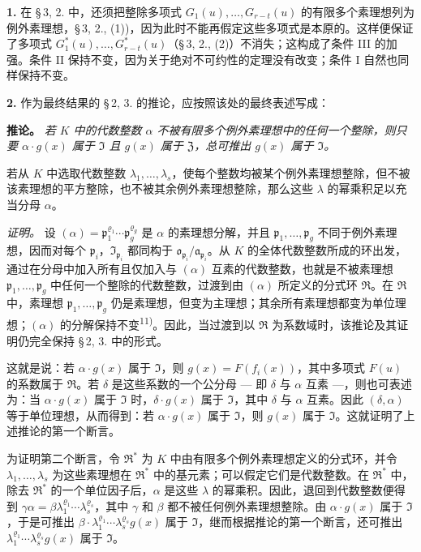 \documentclass[11pt]{article}
\begin{document}
\medskip\noindent\textbf{1.}
在 \S\,3, 2. 中，还须把整除多项式 $G_1(u),\ldots,G_{r-t}(u)$ 的有限多个素理想列为例外素理想，\S\,3, 2., (1))，因为此时不能再假定这些多项式是本原的。这样便保证了多项式 $G^*_1(u),\ldots,G^*_{r-t}(u)$（\S\,3, 2., (2)）不消失；这构成了条件 III 的加强。条件 II 保持不变，因为关于绝对不可约性的定理没有改变；条件 I 自然也同样保持不变。

\medskip\noindent\textbf{2.}
作为最终结果的 \S\,2, 3. 的推论，应按照该处的最终表述写成：

\noindent\textbf{推论。}
\textit{若 $K$ 中的代数整数 $\alpha$ 不被有限多个例外素理想中的任何一个整除，则只要 $\alpha \cdot g(x)$ 属于 $\mathfrak{I}$ 且 $g(x)$ 属于 $\mathfrak{Z}$，总可推出 $g(x)$ 属于 $\mathfrak{I}$。}

若从 $K$ 中选取代数整数 $\lambda_1,\ldots,\lambda_s$，使每个整数均被某个例外素理想整除，但不被该素理想的平方整除，也不被其余例外素理想整除，那么这些 $\lambda$ 的幂乘积足以充当分母 $\alpha$。

\noindent\textit{证明。}
设 $(\alpha) = \mathfrak{p}_1^{\varrho_1} \cdots \mathfrak{p}_g^{\varrho_g}$ 是 $\alpha$ 的素理想分解，并且 $\mathfrak{p}_1,\ldots,\mathfrak{p}_g$ 不同于例外素理想，因而对每个 $\mathfrak{p}_i$，$\mathfrak{I}_{\mathfrak{p}_i}$ 都同构于 $\mathfrak{o}_{\mathfrak{p}_i}/\mathfrak{a}_{\mathfrak{p}_i}$。从 $K$ 的全体代数整数所成的环出发，通过在分母中加入所有且仅加入与 $(\alpha)$ 互素的代数整数，也就是不被素理想 $\mathfrak{p}_1,\ldots,\mathfrak{p}_g$ 中任何一个整除的代数整数，过渡到由 $(\alpha)$ 所定义的分式环 $\mathfrak{R}$。在 $\mathfrak{R}$ 中，素理想 $\mathfrak{p}_1,\ldots,\mathfrak{p}_g$ 仍是素理想，但变为主理想；其余所有素理想都变为单位理想；$(\alpha)$ 的分解保持不变\textsuperscript{11)}。因此，当过渡到以 $\mathfrak{R}$ 为系数域时，该推论及其证明仍完全保持 \S\,2, 3. 中的形式。

这就是说：若 $\alpha \cdot g(x)$ 属于 $\mathfrak{I}$，则 $g(x) = F(f_i(x))$，其中多项式 $F(u)$ 的系数属于 $\mathfrak{R}$。若 $\delta$ 是这些系数的一个公分母 --- 即 $\delta$ 与 $\alpha$ 互素 ---，则也可表述为：当 $\alpha \cdot g(x)$ 属于 $\mathfrak{I}$ 时，$\delta \cdot g(x)$ 属于 $\mathfrak{I}$，其中 $\delta$ 与 $\alpha$ 互素。因此 $(\delta, \alpha)$ 等于单位理想，从而得到：若 $\alpha \cdot g(x)$ 属于 $\mathfrak{I}$，则 $g(x)$ 属于 $\mathfrak{I}$。这就证明了上述推论的第一个断言。

为证明第二个断言，令 $\mathfrak{R}^*$ 为 $K$ 中由有限多个例外素理想定义的分式环，并令 $\lambda_1,\ldots,\lambda_s$ 为这些素理想在 $\mathfrak{R}^*$ 中的基元素；可以假定它们是代数整数。在 $\mathfrak{R}^*$ 中，除去 $\mathfrak{R}^*$ 的一个单位因子后，$\alpha$ 是这些 $\lambda$ 的幂乘积。因此，退回到代数整数便得到 $\gamma\alpha = \beta \lambda_1^{\varrho_1} \cdots \lambda_s^{\varrho_s}$，其中 $\gamma$ 和 $\beta$ 都不被任何例外素理想整除。由 $\alpha \cdot g(x)$ 属于 $\mathfrak{I}$，于是可推出 $\beta \cdot \lambda_1^{\varrho_1} \cdots \lambda_s^{\varrho_s} g(x)$ 属于 $\mathfrak{I}$，继而根据推论的第一个断言，还可推出 $\lambda_1^{\varrho_1} \cdots \lambda_s^{\varrho_s} g(x)$ 属于 $\mathfrak{I}$。
\end{document}
